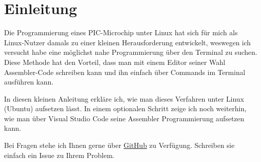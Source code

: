 \section{Einleitung}
\label{sec:einleitung}
Die Programmierung eines PIC-Microchip unter Linux hat sich für mich als Linux-Nutzer damals zu einer kleinen Herausforderung entwickelt, weswegen ich versucht habe eine möglichst nahe Programmierung über den Terminal zu suchen. Diese Methode hat den Vorteil, dass man mit einem Editor seiner Wahl Assembler-Code schreiben kann und ihn einfach über Commands im Terminal ausführen kann.

In diesen kleinen Anleitung erkläre ich, wie man dieses Verfahren unter Linux (Ubuntu) aufsetzen lässt. In einem optionalen Schritt zeige ich noch weiterhin, wie man über Visual Studio Code seine Assembler Programmierung aufsetzen kann.

Bei Fragen stehe ich Ihnen gerne über \href{https://github.com/ManeLippert/AssemblerVSCode}{GitHub} zu Verfügung. Schreiben sie einfach ein Issue zu Ihrem Problem.